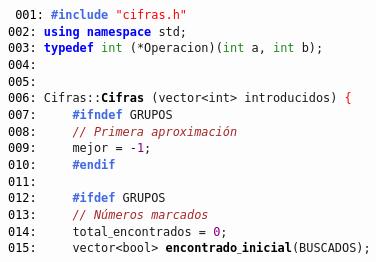 \documentclass[a4paper,10pt]{scrartcl}
\begin{document}
   
   \small
   \texttt{%
   \noindent
   \mbox{}\texttt{\textcolor{Black}{001:}} \textbf{\textcolor{RoyalBlue}{\#include}}\ \texttt{\textcolor{Red}{"{}cifras.h"{}}} \\
   \mbox{}\texttt{\textcolor{Black}{002:}} \textbf{\textcolor{Blue}{using}}\ \textbf{\textcolor{Blue}{namespace}}\ std\textcolor{BrickRed}{;} \\
   \mbox{}\texttt{\textcolor{Black}{003:}} \textbf{\textcolor{Blue}{typedef}}\ \textcolor{ForestGreen}{int}\ \textcolor{BrickRed}{(*}Operacion\textcolor{BrickRed}{)(}\textcolor{ForestGreen}{int}\ a\textcolor{BrickRed}{,}\ \textcolor{ForestGreen}{int}\ b\textcolor{BrickRed}{);}\  \\
   \mbox{}\texttt{\textcolor{Black}{004:}}  \\
   \mbox{}\texttt{\textcolor{Black}{005:}}  \\
   \mbox{}\texttt{\textcolor{Black}{006:}} Cifras\textcolor{BrickRed}{::}\textbf{\textcolor{Black}{Cifras}}\ \textcolor{BrickRed}{(}\textcolor{TealBlue}{vector\textless{}int\textgreater{}}\ introducidos\textcolor{BrickRed}{)}\ \textcolor{Red}{\{} \\
   \mbox{}\texttt{\textcolor{Black}{007:}} \textbf{\textcolor{RoyalBlue}{\ \ \ \ \#ifndef}}\ GRUPOS \\
   \mbox{}\texttt{\textcolor{Black}{008:}} \ \ \ \ \textit{\textcolor{Brown}{//\ Primera\ aproximación}} \\
   \mbox{}\texttt{\textcolor{Black}{009:}} \ \ \ \ mejor\ \textcolor{BrickRed}{=}\ \textcolor{BrickRed}{-}\textcolor{Purple}{1}\textcolor{BrickRed}{;} \\
   \mbox{}\texttt{\textcolor{Black}{010:}} \textbf{\textcolor{RoyalBlue}{\ \ \ \ \#endif}} \\
   \mbox{}\texttt{\textcolor{Black}{011:}} \ \  \\
   \mbox{}\texttt{\textcolor{Black}{012:}} \textbf{\textcolor{RoyalBlue}{\ \ \ \ \#ifdef}}\ GRUPOS \\
   \mbox{}\texttt{\textcolor{Black}{013:}} \ \ \ \ \textit{\textcolor{Brown}{//\ Números\ marcados}} \\
   \mbox{}\texttt{\textcolor{Black}{014:}} \ \ \ \ total$\_$encontrados\ \textcolor{BrickRed}{=}\ \textcolor{Purple}{0}\textcolor{BrickRed}{;} \\
   \mbox{}\texttt{\textcolor{Black}{015:}} \ \ \ \ \textcolor{TealBlue}{vector\textless{}bool\textgreater{}}\ \textbf{\textcolor{Black}{encontrado$\_$inicial}}\textcolor{BrickRed}{(}BUSCADOS\textcolor{BrickRed}{);} \\
}
\end{document}
